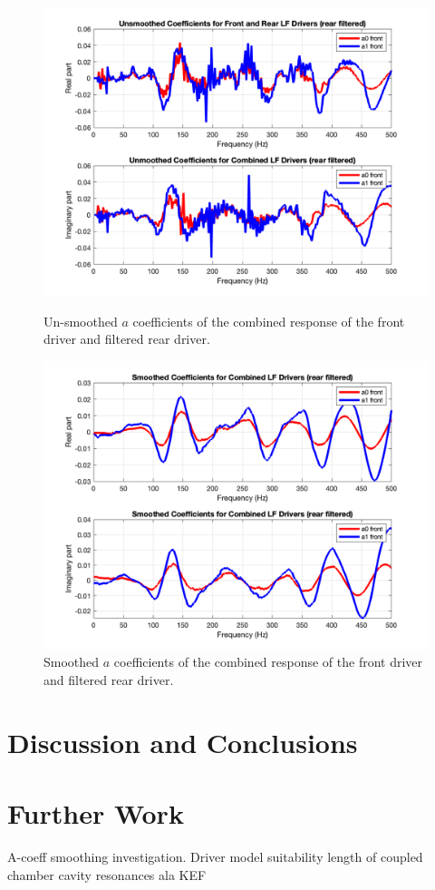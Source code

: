 \documentclass{report}
\begin{document}
        \begin{figure}[H]
            \begin{minipage}{.49\textwidth}
                \includegraphics[width=\linewidth]{figs/filteredaCoeffNoSmooth.png}
                \caption{Un-smoothed $a$ coefficients of the combined response of the front driver and filtered rear driver.}
                \label{filteredaCoeffNoSmooth}
            \end{minipage}
            \begin{minipage}{.49\textwidth}
                \includegraphics[width=\linewidth]{figs/filteredaCoeffsSmoothed.png}
                \caption{Smoothed $a$ coefficients of the combined response of the front driver and filtered rear driver.}
                \label{filteredaCoeffsSmoothed}
            \end{minipage}
        \end{figure}






\chapter{Discussion and Conclusions}

\chapter{Further Work}
    A-coeff smoothing investigation.
    Driver model suitability
    length of coupled chamber
    cavity resonances ala KEF



\end{document}
